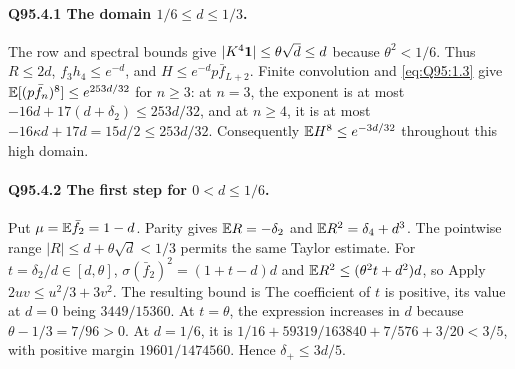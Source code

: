 \paragraph{Q95.4.1 The domain \(1/6\le\allowbreak  d\le\allowbreak 1/3\).}
The row and spectral bounds give \(|K^4\mathbf1|\le\allowbreak \theta\sqrt d\le\allowbreak  d\)
because \(\theta^2<\allowbreak 1/6\). Thus \(R\le\allowbreak 2d\), \(f_3h_4\le\allowbreak  e^{-d}\),
and \(H\le\allowbreak  e^{-d}p\bar f_{L+2}\).
Finite convolution and \eqref{eq:Q95:1.3} give
\(\mathbb E[(p\bar f_n)^8]\le\allowbreak  e^{253d/32}\) for \(n\ge\allowbreak 3\):
at \(n=\allowbreak 3\), the exponent is at most
\(-16d+17(d+\delta_2)\le\allowbreak 253d/32\), and at \(n\ge\allowbreak 4\), it is at most
\(-16\kappa d+17d=\allowbreak 15d/2\le\allowbreak 253d/32\).
Consequently \(\mathbb E H^8\le\allowbreak  e^{-3d/32}\) throughout this high domain.

\paragraph{Q95.4.2 The first step for \(0<\allowbreak d\le\allowbreak 1/6\).}
Put \(\mu=\allowbreak \mathbb E\bar f_2=\allowbreak 1-d\). Parity gives
\(\mathbb E R=\allowbreak -\delta_2\) and \(\mathbb E R^2=\allowbreak \delta_4+d^3\).
The pointwise range \(|R|\le\allowbreak  d+\theta\sqrt d<\allowbreak 1/3\) permits the same
Taylor estimate. For \(t=\allowbreak \delta_2/d\in[d,\allowbreak \theta]\),
\(\sigma(\bar f_2)^2=\allowbreak (1+t-d)d\) and
\(\mathbb E R^2\le\allowbreak (\theta^2t+d^2)d\), so
Apply \(2uv\le\allowbreak  u^2/3+3v^2\). The resulting bound is
The coefficient of \(t\) is positive, its value at \(d=\allowbreak 0\) being
\(3449/15360\). At \(t=\allowbreak \theta\), the expression increases in \(d\)
because \(\theta-1/3=\allowbreak 7/96>\allowbreak 0\). At \(d=\allowbreak 1/6\), it is
\(1/16+59319/163840+7/576+3/20<\allowbreak 3/5\), with positive margin
\(19601/1474560\). Hence \(\delta_+\le\allowbreak 3d/5\).

